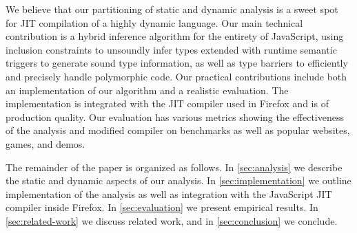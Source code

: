 We believe that our partitioning of static and dynamic analysis
is a sweet spot for JIT compilation of a highly dynamic language.
Our main technical contribution is a hybrid inference algorithm for the
entirety of JavaScript, using inclusion constraints to unsoundly infer
types extended with runtime semantic triggers to generate sound type
information, as well as type barriers to efficiently and precisely handle
polymorphic code. Our practical contributions include both an
implementation of our algorithm and a realistic evaluation. The implementation
is integrated with the JIT compiler used in Firefox and is of production
quality. Our evaluation has various metrics showing the effectiveness of the
analysis and modified compiler on benchmarks as well as popular websites,
games, and demos.








The remainder of the paper is organized as follows. In \Section\ref{sec:analysis}
we describe the static and dynamic aspects of our
analysis. In \Section\ref{sec:implementation} we outline implementation of the
analysis as well as integration with the JavaScript JIT compiler inside
Firefox. In \Section\ref{sec:evaluation} we present empirical
results. In \Section\ref{sec:related-work} we discuss related work, and in
\Section\ref{sec:conclusion} we conclude.


